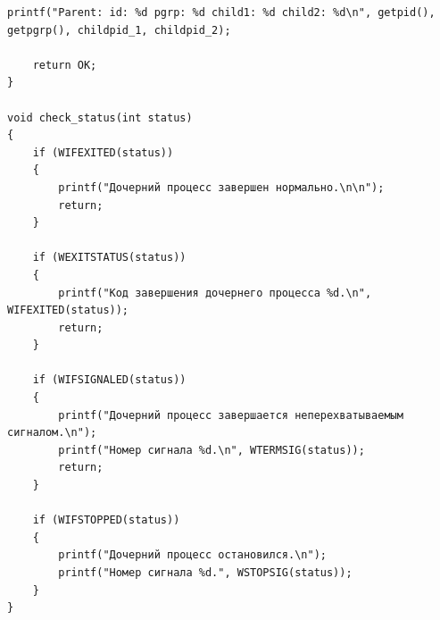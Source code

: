 \begin{lstlisting}[label=some-code,caption=Программа 3.]
	printf("Parent: id: %d pgrp: %d child1: %d child2: %d\n", getpid(), getpgrp(), childpid_1, childpid_2);

	return OK;
}

void check_status(int status)
{
	if (WIFEXITED(status))
	{
		printf("Дочерний процесс завершен нормально.\n\n");
		return;
	}

	if (WEXITSTATUS(status))
	{
		printf("Код завершения дочернего процесса %d.\n", WIFEXITED(status));
		return;
	}

	if (WIFSIGNALED(status))
	{
		printf("Дочерний процесс завершается неперехватываемым сигналом.\n");
		printf("Номер сигнала %d.\n", WTERMSIG(status));
		return;
	}

	if (WIFSTOPPED(status))
	{
		printf("Дочерний процесс остановился.\n");
		printf("Номер сигнала %d.", WSTOPSIG(status));
	}
}
\end{lstlisting}


\begin{figure}[ht!]
\end{figure}

\clearpage

